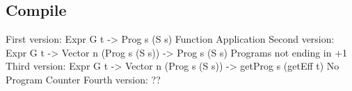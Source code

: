 \subsection{Compile}

	First version: Expr G t -> Prog s (S s)
		Function Application
	Second version: Expr G t -> Vector n (Prog s (S s)) -> Prog s (S s)
		Programs not ending in +1
	Third version: Expr G t -> Vector n (Prog s (S s)) -> getProg s (getEff t)
		No Program Counter
	Fourth version: ??